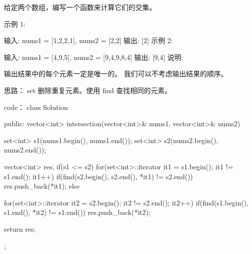 给定两个数组，编写一个函数来计算它们的交集。

示例 1:

输入: nums1 = [1,2,2,1], nums2 = [2,2]
输出: [2]
示例 2:

输入: nums1 = [4,9,5], nums2 = [9,4,9,8,4]
输出: [9,4]
说明:

输出结果中的每个元素一定是唯一的。
我们可以不考虑输出结果的顺序。



















思路：
set 删除重复元素。使用 find 查找相同的元素。
























code：
class Solution {
public:
    vector<int> intersection(vector<int>& nums1, vector<int>& nums2) {
        set<int> s1(nums1.begin(), nums1.end());
        set<int> s2(nums2.begin(), nums2.end());
        
        vector<int> res;
        if(s1 <= s2)
        {
            for(set<int>::iterator it1 = s1.begin(); it1 != s1.end(); it1++)
            {
                if(find(s2.begin(), s2.end(), *it1) != s2.end())
                    res.push_back(*it1);
            }
        }
        else
        {
            for(set<int>::iterator it2 = s2.begin(); it2 != s2.end(); it2++)
            {
                if(find(s1.begin(), s1.end(), *it2) != s1.end())
                    res.push_back(*it2);
            }
            
        }
        return res;
    }
};